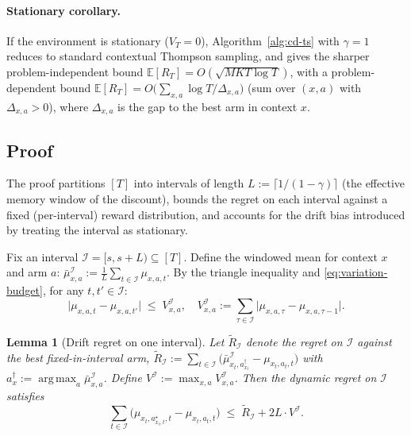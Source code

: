 \documentclass[11pt]{article}
\newtheorem{lemma}[theorem]{Lemma}
\theoremstyle{definition}
\newcommand{\E}{\mathbb{E}}
\DeclareMathOperator*{\argmax}{arg\,max}
\begin{document}
\paragraph{Stationary corollary.}
If the environment is stationary ($V_T = 0$), Algorithm~\ref{alg:cd-ts}
with $\gamma = 1$ reduces to standard contextual Thompson sampling, and
\cite{agrawal2013further} gives the sharper problem-independent bound
$\E[R_T] = O(\sqrt{MKT \log T})$, with a problem-dependent bound
$\E[R_T] = O\!\big(\sum_{x,a} \log T / \Delta_{x,a}\big)$
(sum over $(x,a)$ with $\Delta_{x,a} > 0$), where $\Delta_{x,a}$ is the
gap to the best arm in context $x$.

\subsection{Proof}

The proof partitions $[T]$ into intervals of length
$L := \lceil 1/(1-\gamma) \rceil$ (the effective memory window of the
discount), bounds the regret on each interval against a fixed
(per-interval) reward distribution, and accounts for the drift bias
introduced by treating the interval as stationary.

Fix an interval $\mathcal{I} = [s, s+L) \subseteq [T]$. Define the
windowed mean for context $x$ and arm $a$:
$\bar{\mu}_{x,a}^{\mathcal{I}} := \frac{1}{L} \sum_{t \in \mathcal{I}} \mu_{x,a,t}$.
By the triangle inequality and \eqref{eq:variation-budget}, for any
$t, t' \in \mathcal{I}$:
\[
\big|\mu_{x,a,t} - \mu_{x,a,t'}\big| \;\leq\; V^{\mathcal{I}}_{x,a},
\quad
V^{\mathcal{I}}_{x,a} := \sum_{\tau \in \mathcal{I}}\big|\mu_{x,a,\tau} - \mu_{x,a,\tau-1}\big|.
\]

\begin{lemma}[Drift regret on one interval]
\label{lem:drift}
Let $\widetilde{R}_{\mathcal{I}}$ denote the regret on $\mathcal{I}$
against the \emph{best fixed-in-interval} arm,
$\widetilde{R}_{\mathcal{I}} := \sum_{t \in \mathcal{I}} \big(\bar{\mu}^{\mathcal{I}}_{x_t, a^\dagger_{x_t}} - \mu_{x_t, a_t, t}\big)$
with $a^\dagger_x := \argmax_a \bar{\mu}^{\mathcal{I}}_{x,a}$. Define
$V^{\mathcal{I}} := \max_{x,a} V^{\mathcal{I}}_{x,a}$. Then the dynamic regret on $\mathcal{I}$ satisfies
\begin{equation}
\sum_{t \in \mathcal{I}}\big(\mu_{x_t, a^\star_{x_t, t}, t} - \mu_{x_t, a_t, t}\big) \;\leq\; \widetilde{R}_{\mathcal{I}} + 2 L \cdot V^{\mathcal{I}}.
\label{eq:lem-drift}
\end{equation}
\end{lemma}
\end{document}
